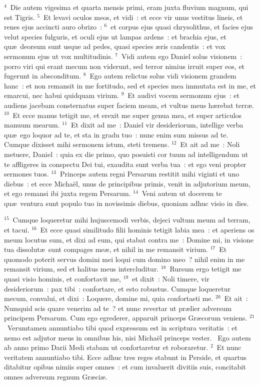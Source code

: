 ${}^{4}$~Die autem vigesima et quarta mensis primi, eram juxta fluvium magnum, qui est Tigris.
${}^{5}$~Et levavi oculos meos, et vidi~: et ecce vir unus vestitus lineis, et renes ejus accincti auro obrizo~:
${}^{6}$~et corpus ejus quasi chrysolithus, et facies ejus velut species fulguris, et oculi ejus ut lampas ardens~: et brachia ejus, et qu\ae\ deorsum sunt usque ad pedes, quasi species \ae ris candentis~: et vox sermonum ejus ut vox multitudinis.
${}^{7}$~Vidi autem ego Daniel solus visionem~: porro viri qui erant mecum non viderunt, sed terror nimius irruit super eos, et fugerunt in absconditum.
${}^{8}$~Ego autem relictus solus vidi visionem grandem hanc~: et non remansit in me fortitudo, sed et species mea immutata est in me, et emarcui, nec habui quidquam virium.
${}^{9}$~Et audivi vocem sermonum ejus~: et audiens jacebam consternatus super faciem meam, et vultus meus h\ae rebat terr\ae .
${}^{10}$~Et ecce manus tetigit me, et erexit me super genua mea, et super articulos manuum mearum.
${}^{11}$~Et dixit ad me~: Daniel vir desideriorum, intellige verba qu\ae\ ego loquor ad te, et sta in gradu tuo~: nunc enim sum missus ad te. Cumque dixisset mihi sermonem istum, steti tremens.
${}^{12}$~Et ait ad me~: Noli metuere, Daniel~: quia ex die primo, quo posuisti cor tuum ad intelligendum ut te affligeres in conspectu Dei tui, exaudita sunt verba tua~: et ego veni propter sermones tuos.
${}^{13}$~Princeps autem regni Persarum restitit mihi viginti et uno diebus~: et ecce Micha\"el, unus de principibus primis, venit in adjutorium meum, et ego remansi ibi juxta regem Persarum.
${}^{14}$~Veni autem ut docerem te qu\ae\ ventura sunt populo tuo in novissimis diebus, quoniam adhuc visio in dies.


${}^{15}$~Cumque loqueretur mihi hujuscemodi verbis, dejeci vultum meum ad terram, et tacui.
${}^{16}$~Et ecce quasi similitudo filii hominis tetigit labia mea~: et aperiens os meum locutus sum, et dixi ad eum, qui stabat contra me~: Domine mi, in visione tua dissolut\ae\ sunt compages me\ae , et nihil in me remansit virium.
${}^{17}$~Et quomodo poterit servus domini mei loqui cum domino meo~? nihil enim in me remansit virium, sed et halitus meus intercluditur.
${}^{18}$~Rursum ergo tetigit me quasi visio hominis, et confortavit me,
${}^{19}$~et dixit~: Noli timere, vir desideriorum~: pax tibi~: confortare, et esto robustus. Cumque loqueretur mecum, convalui, et dixi~: Loquere, domine mi, quia confortasti me.
${}^{20}$~Et ait~: Numquid scis quare venerim ad te~? et nunc revertar ut pr\ae lier adversum principem Persarum. Cum ego egrederer, apparuit princeps Gr\ae corum veniens.
${}^{21}$~Verumtamen annuntiabo tibi quod expressum est in scriptura veritatis~: et nemo est adjutor meus in omnibus his, nisi Micha\"el princeps vester.
~\lettrine[lines=10,image=true,loversize=0.05,lraise=-0.03]{E}{}go autem ab anno primo Darii Medi stabam ut confortaretur et roboraretur.
${}^{2}$~Et nunc veritatem annuntiabo tibi. Ecce adhuc tres reges stabunt in Perside, et quartus ditabitur opibus nimiis super omnes~: et cum invaluerit divitiis suis, concitabit omnes adversum regnum Gr\ae ci\ae .


